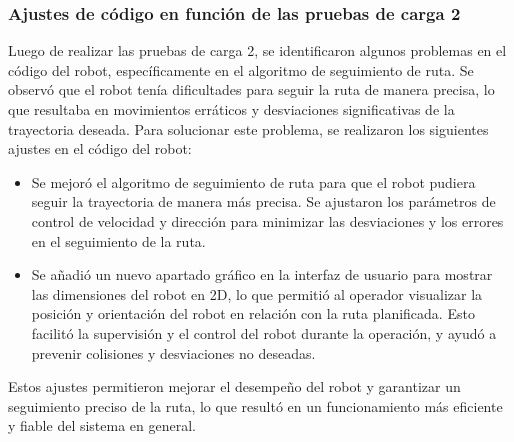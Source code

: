 \subsubsection{Ajustes de c\'odigo en funci\'on de las pruebas de carga 2} %
\label{sub:Ajustes de c\'odigo en funci\'on de las pruebas de carga 2}
    Luego de realizar las pruebas de carga 2, se identificaron algunos problemas en el c\'odigo del robot, 
        espec\'ificamente en el algoritmo de seguimiento de ruta. Se observ\'o que el robot ten\'ia dificultades 
        para seguir la ruta de manera precisa, lo que resultaba en movimientos err\'aticos y desviaciones 
        significativas de la trayectoria deseada. Para solucionar este problema, se realizaron los siguientes ajustes 
        en el c\'odigo del robot:
    \vskip 0.5cm
    \begin{itemize}
        \item Se mejor\'o el algoritmo de seguimiento de ruta para que el robot pudiera seguir la trayectoria de manera m\'as precisa. 
            Se ajustaron los par\'ametros de control de velocidad y direcci\'on para minimizar las desviaciones y los errores en el 
            seguimiento de la ruta.
        \item Se a\~nadi\'o un nuevo apartado gr\'afico en la interfaz de usuario para mostrar las dimensiones del robot en 2D, 
            lo que permiti\'o al operador visualizar
            la posici\'on y orientaci\'on del robot en relaci\'on con la ruta planificada. Esto facilit\'o la supervisi\'on y el
            control del robot durante la operaci\'on, y ayud\'o a prevenir colisiones y desviaciones no deseadas.
    \end{itemize}
    \vskip 0.5cm
    Estos ajustes permitieron mejorar el desempe\~no del robot y garantizar un seguimiento preciso de la ruta, 
        lo que result\'o en un funcionamiento m\'as eficiente y fiable del sistema en general.
